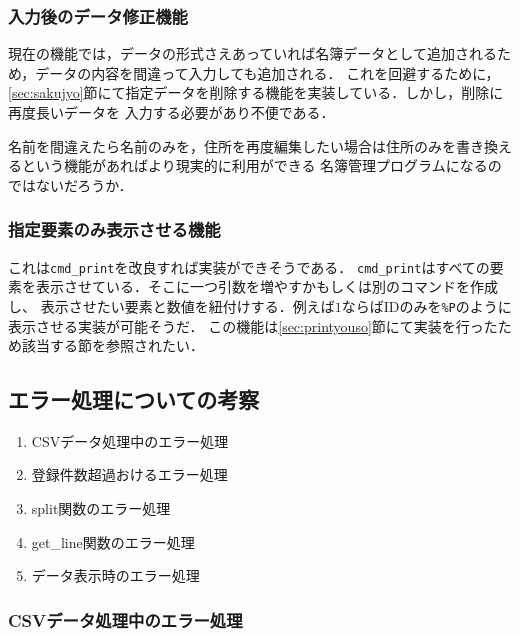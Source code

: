 \documentclass[a4j,11pt]{jarticle}
\begin{document}
\subsubsection{入力後のデータ修正機能}
現在の機能では，データの形式さえあっていれば名簿データとして追加されるため，データの内容を間違って入力しても追加される．
これを回避するために，\ref{sec:sakujyo}節にて指定データを削除する機能を実装している．しかし，削除に再度長いデータを
入力する必要があり不便である．

名前を間違えたら名前のみを，住所を再度編集したい場合は住所のみを書き換えるという機能があればより現実的に利用ができる
名簿管理プログラムになるのではないだろうか．
\subsubsection{指定要素のみ表示させる機能}
これは\verb|cmd_print|を改良すれば実装ができそうである．
\verb|cmd_print|はすべての要素を表示させている．そこに一つ引数を増やすかもしくは別のコマンドを作成し、
表示させたい要素と数値を紐付けする．例えば$1$ならばIDのみを\verb|%P|のように表示させる実装が可能そうだ．
この機能は\ref{sec:printyouso}節にて実装を行ったため該当する節を参照されたい．

\subsection{エラー処理についての考察}
\begin{enumerate}
\setlength{\parskip}{2pt} \setlength{\itemsep}{2pt}
    \item CSVデータ処理中のエラー処理
    \item 登録件数超過おけるエラー処理
    \item split関数のエラー処理
    \item get\_line関数のエラー処理
    \item データ表示時のエラー処理
\end{enumerate}


\subsubsection{CSVデータ処理中のエラー処理}
\end{document}
